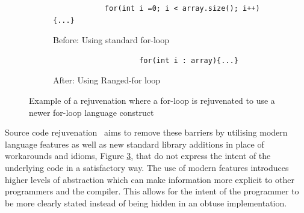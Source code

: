 \documentclass[bsc,frontabs,singlespacing,twoside,parskip,deptreport]{infthesis}
\begin{document}
\begin{figure}[H]
    \centering

    \begin{subfigure}[h]{\textwidth}
        
        \begin{verbatim}
            for(int i =0; i < array.size(); i++){...}
        \end{verbatim}
        \caption{Before: Using standard for-loop}
        \vspace{0.2cm}
        \label{fig:for-arr-before}
    \end{subfigure}
    
    \begin{subfigure}[h]{\textwidth}
        \centering
        \begin{verbatim}
                    for(int i : array){...}
        \end{verbatim}
        \caption{After: Using Ranged-for loop}
        \label{fig:for-arr-after}
    \end{subfigure}

    \caption{Example of a rejuvenation where a for-loop is rejuvenated to use a newer for-loop language construct}
    \label{fig:example-rejuv}
\end{figure}


    
Source code rejuvenation~\cite{STROUSTRUP_REJUV} aims to remove these barriers by utilising modern language features as well as new standard library additions in place of workarounds and idioms, Figure \ref{fig:example-rejuv}, that do not express the intent of the underlying code in a satisfactory way. The use of modern features introduces higher levels of abstraction which can make information more explicit to other programmers and the compiler. This allows for the intent of the programmer to be more clearly stated instead of being hidden in an obtuse implementation. 
\end{document}
